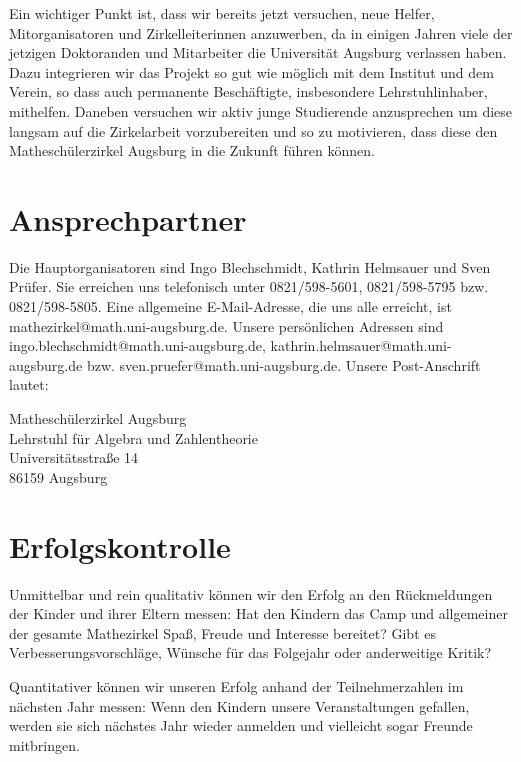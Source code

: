 \documentclass[12pt]{zettel}
\begin{document}
Ein wichtiger Punkt ist, dass wir bereits jetzt versuchen, neue Helfer,
Mitorganisatoren und Zirkelleiterinnen anzuwerben, da in einigen Jahren
viele der jetzigen Doktoranden und Mitarbeiter die Universität Augsburg
verlassen haben. Dazu integrieren wir das Projekt so gut wie möglich mit
dem Institut und dem Verein, so dass auch permanente Beschäftigte,
insbesondere Lehrstuhlinhaber, mithelfen. Daneben versuchen wir aktiv
junge Studierende anzusprechen um diese langsam auf die Zirkelarbeit
vorzubereiten und so zu motivieren, dass diese den Matheschülerzirkel
Augsburg in die Zukunft führen können.


\section{Ansprechpartner}

Die Hauptorganisatoren sind Ingo Blechschmidt, Kathrin Helmsauer und Sven
Prüfer. Sie erreichen uns telefonisch unter 0821/598-5601, 0821/598-5795 bzw.
0821/598-5805. Eine allgemeine E-Mail-Adresse, die uns alle erreicht, ist
\textsf{mathezirkel@math.uni-augsburg.de}. Unsere persönlichen Adressen sind
\textsf{ingo.blechschmidt@math.uni-augsburg.de},
\textsf{kathrin.helmsauer@math.uni-augsburg.de} bzw.
\textsf{sven.pruefer@math.uni-augsburg.de}. Unsere Post-Anschrift lautet:

\begin{tabbing}
  Matheschülerzirkel Augsburg \\
  Lehrstuhl für Algebra und Zahlentheorie \\
  Universitätsstraße 14 \\
  86159 Augsburg
\end{tabbing}


\section{Erfolgskontrolle}

Unmittelbar und rein qualitativ können wir den Erfolg an den Rückmeldungen der
Kinder und ihrer Eltern messen: Hat den Kindern das Camp und allgemeiner der
gesamte Mathezirkel Spaß, Freude und Interesse bereitet? Gibt es
Verbesserungsvorschläge, Wünsche für das Folgejahr oder anderweitige Kritik?

Quantitativer können wir unseren Erfolg anhand der Teilnehmerzahlen im nächsten
Jahr messen: Wenn den Kindern unsere Veranstaltungen gefallen, werden sie sich
nächstes Jahr wieder anmelden und vielleicht sogar Freunde mitbringen.
\end{document}
